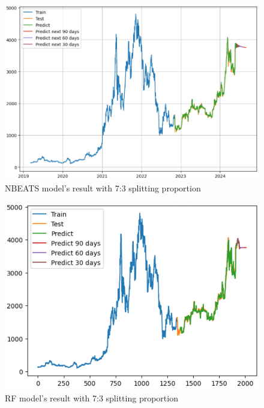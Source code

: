 \documentclass{ieeeojies}
\begin{document}
\begin{figure}[H]
	\centering
	\begin{minipage}{0.8\linewidth}
		\centering
		\includegraphics[width=\linewidth]{bibliography/Images/NBEATS_ETH_73.PNG}
		\caption{NBEATS model's result with 7:3 splitting proportion}
	\end{minipage}
\end{figure}
\begin{figure}[H]
	\centering
	\begin{minipage}{0.8\linewidth}
		\centering
		\includegraphics[width=\linewidth]{bibliography/Images/RF_ETH_73.PNG}
		\caption{RF model's result with 7:3 splitting proportion}
	\end{minipage}
\end{figure}
\end{document}
